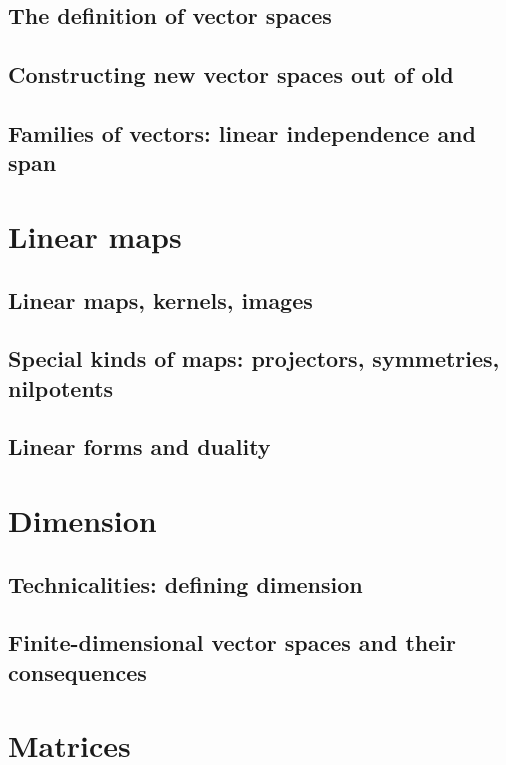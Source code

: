 \documentclass{book}
\theoremstyle{plain}
\theoremstyle{definition}
\theoremstyle{remark}
\begin{document}
\section{The definition of vector spaces}

\section{Constructing new vector spaces out of old}

\section{Families of vectors: linear independence and span}

\chapter{Linear maps}

\section{Linear maps, kernels, images}

\section{Special kinds of maps: projectors, symmetries, nilpotents}

\section{Linear forms and duality}

\chapter{Dimension}

\section{Technicalities: defining dimension}

\section{Finite-dimensional vector spaces and their consequences}

\chapter{Matrices}
\end{document}
